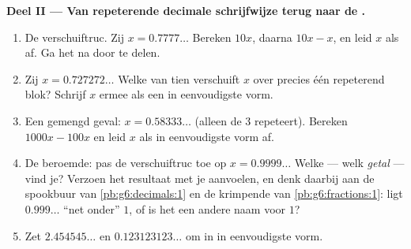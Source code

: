 \begin{problem}
\medskip
\noindent\textbf{Deel II --- Van repeterende decimale schrijfwijze terug naar de
.}
\begin{enumerate}[resume]
  \item De verschuiftruc. Zij $x = 0.7777\ldots$ Bereken $10x$, daarna
        $10x - x$, en leid $x$ als  af. Ga het na door te delen.
  \item Zij $x = 0.727272\ldots$ Welke  van tien verschuift $x$ over precies
        één repeterend blok? Schrijf $x$ ermee als een  in eenvoudigste
        vorm.
  \item Een gemengd geval: $x = 0.58333\ldots$ (alleen de $3$ repeteert). Bereken
        $1000x - 100x$ en leid $x$ als  in eenvoudigste vorm af.
  \item De beroemde: pas de verschuiftruc toe op $x = 0.9999\ldots$ Welke 
        --- welk \emph{getal} --- vind je? Verzoen het resultaat met je
        aanvoelen, en denk daarbij aan de spookbuur van
        \cref{pb:g6:decimals:1} en de krimpende  van
        \cref{pb:g6:fractions:1}: ligt $0.999\ldots$ ``net onder'' $1$, of is het
        een andere naam voor $1$?
  \item Zet $2.454545\ldots$ en $0.123123123\ldots$ om in  in
        eenvoudigste vorm.
\end{enumerate}


\end{problem}
